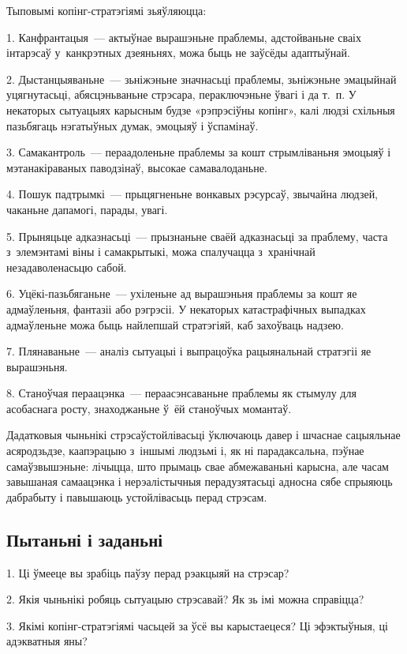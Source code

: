Тыповымі копінг-стратэгіямі зьяўляюцца:

1. Канфрантацыя~--- актыўнае вырашэньне праблемы, адстойваньне сваіх інтарэсаў у~канкрэтных дзеяньнях, можа быць не заўсёды адаптыўнай.

2. Дыстанцыяваньне~--- зьніжэньне значнасьці праблемы, зьніжэньне эмацыйнай уцягнутасьці, абясцэньваньне стрэсара, пераключэньне ўвагі і да т.~п. У некаторых сытуацыях карысным будзе «рэпрэсіўны копінг», калі людзі схільныя пазьбягаць нэгатыўных думак, эмоцыяў і ўспамінаў.

3. Самакантроль~--- пераадоленьне праблемы за кошт стрымліваньня эмоцыяў і мэтанакіраваных паводзінаў, высокае самавалоданьне.

4. Пошук падтрымкі~--- прыцягненьне вонкавых рэсурсаў, звычайна людзей, чаканьне дапамогі, парады, увагі.

5. Прыняцьце адказнасьці~--- прызнаньне сваёй адказнасьці за праблему, часта з~элемэнтамі віны і самакрытыкі, можа спалучацца з~хранічнай незадаволенасьцю сабой.

6. Уцёкі-пазьбяганьне~--- ухіленьне ад вырашэньня праблемы за кошт яе адмаўленьня, фантазіі або рэгрэсіі. У некаторых катастрафічных выпадках адмаўленьне можа быць найлепшай стратэгіяй, каб захоўваць надзею.

7. Плянаваньне~--- аналіз сытуацыі і выпрацоўка рацыянальнай стратэгіі яе вырашэньня.

8. Станоўчая пераацэнка~--- пераасэнсаваньне праблемы як стымулу для асобаснага росту, знаходжаньне ў~ёй станоўчых момантаў.

Дадатковыя чыньнікі стрэсаўстойлівасьці ўключаюць давер і шчаснае сацыяльнае асяродзьдзе, каапэрацыю з~іншымі людзьмі і, як ні парадаксальна, пэўнае самаўзвышэньне: лічыцца, што прымаць свае абмежаваньні карысна, але часам завышаная самаацэнка і нерэалістычныя перадузятасьці адносна сябе спрыяюць дабрабыту і павышаюць устойлівасьць перад стрэсам.

\subsection*{Пытаньні і заданьні}

1. Ці ўмееце вы зрабіць паўзу перад рэакцыяй на стрэсар?

2. Якія чыньнікі робяць сытуацыю стрэсавай? Як зь імі можна справіцца?

3. Якімі копінг-стратэгіямі часьцей за ўсё вы карыстаецеся? Ці эфэктыўныя, ці адэкватныя яны?


